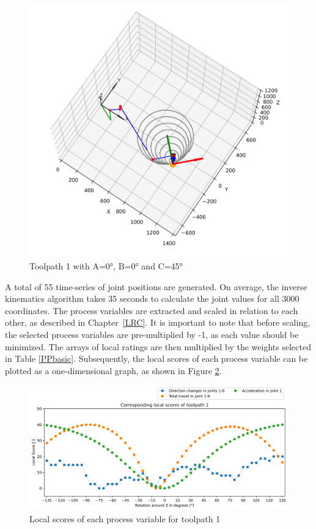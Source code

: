 \begin{figure}[H]
\begin{minipage}{0.5\textwidth}
		\includegraphics[width=\textwidth]{figures/robotANDpath1_45.png}
		\caption{Toolpath 1 with A=0°, B=0° and C=45°}
		\label{TP1+25}
	\end{minipage}\par
\end{figure}

A total of 55 time-series of joint positions are generated. On average, the inverse kinematics algorithm takes 35 seconds to calculate the joint values for all 3000 coordinates. The process variables are extracted and scaled in relation to each other, as described in Chapter~\ref{LRC}. It is important to note that before scaling, the selected process variables are pre-multiplied by -1, as each value should be minimized. The arrays of local ratings are then multiplied by the weights selected in Table \ref{PPbasic}. Subsequently, the local scores of each process variable can be plotted as a one-dimensional graph, as shown in Figure \ref{LS1}.

\begin{figure}[H]
	\centerline{\includegraphics[width=1\textwidth]{figures/LocalScores_1.png}}
	\caption{Local scores of each process variable for toolpath 1}
	\label{LS1}
\end{figure}


